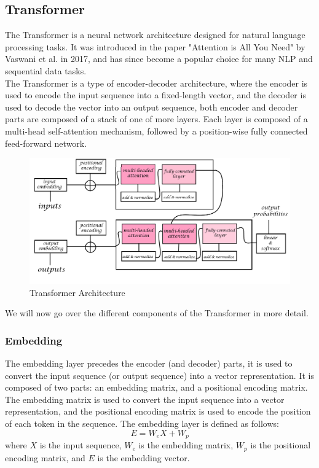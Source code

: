 \documentclass[a4paper]{sapthesis}
\begin{document}
\subsection{Transformer}
The Transformer is a neural network architecture designed for natural
 language processing tasks. It was introduced in the paper "Attention
  is All You Need" by Vaswani et al. in 2017\cite{attention}, and has since become 
  a popular choice for many NLP and sequential data tasks.\newline \\
 The Transformer
   is a type of encoder-decoder architecture, where the encoder is used 
   to encode the input sequence into a fixed-length vector, and the 
   decoder is used to decode the vector into an output sequence, both 
   encoder and decoder parts are composed of a stack of one of more layers.
    Each layer is composed of a multi-head self-attention mechanism, followed 
  by a position-wise fully connected feed-forward network.\newline
\begin{figure}[h]
  \includegraphics[scale=0.42]{transformer}
  \centering
  \caption{Transformer Architecture}\label{fig:transformer}
  \end{figure}
We will now go over the different components of the Transformer in more
 detail.
\subsubsection{Embedding}
The embedding layer precedes the encoder (and decoder) parts, it is used to convert 
the input sequence (or output sequence) into a vector
 representation. It is composed of two parts: an 
 embedding matrix, and a positional encoding matrix. The embedding matrix
  is used to convert the input sequence into a vector representation, and
   the positional encoding matrix is used to encode the position of each 
   token in the sequence. The embedding layer is defined as follows:
   \begin{equation}
     E = W_{e}X + W_p
     \end{equation}
where $X$ is the input sequence, $W_e$ is the embedding matrix, $W_p$ is the
 positional encoding matrix, and $E$ is the embedding vector.
\end{document}
